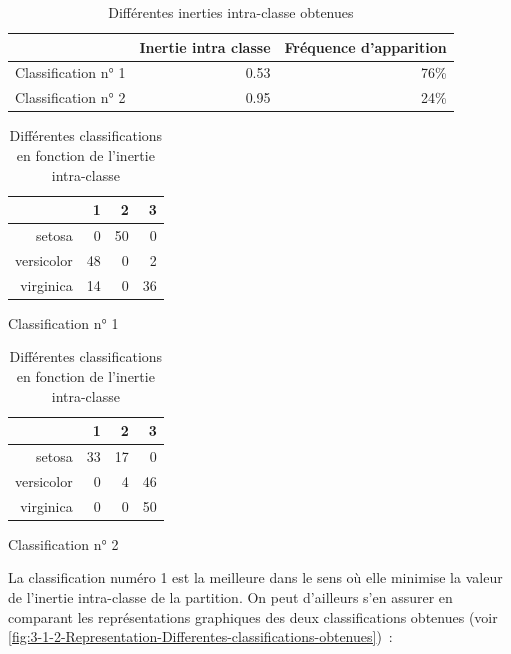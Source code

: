 \documentclass[a4paper,10pt]{report}
\begin{document}
\begin{table}[H]
	\centering
	\captionsetup{justification=centering, margin=3cm}
	\begin{tabular}{r|r|r}
		& Inertie intra classe & Fréquence d'apparition \\ 
		\hline
		Classification n° 1 & 0.53 &  76\% \\ 
		Classification n° 2 & 0.95 &  24\% \\ 
	\end{tabular}
	\caption{\small Différentes inerties intra-classe obtenues}
	\label{table:3-1-2-Différentes-inerties-intra-classe-obtenues}
\end{table}


\begin{table}[H]
	\centering
	\captionsetup{justification=centering, margin=3cm}
	\begin{subtable}{.3\textwidth}
		\centering
		\begin{tabular}{r|rrr}
			& 1 & 2 & 3 \\ 
			\hline
			setosa &   0 &  50 &   0 \\ 
			versicolor &  48 &   0 &   2 \\ 
			virginica &  14 &   0 &  36 \\ 
		\end{tabular}
		\caption{\small Classification n° 1}
	\end{subtable}
	\begin{subtable}{.3\textwidth}
		\centering
		\begin{tabular}{r|rrr}
			& 1 & 2 & 3 \\ 
			\hline
			setosa &  33 &  17 &   0 \\ 
			versicolor &   0 &   4 &  46 \\ 
			virginica &   0 &   0 &  50 \\ 
		\end{tabular}
		\caption{\small Classification n° 2}
	\end{subtable}
	\caption{\small Différentes classifications en fonction de l'inertie intra-classe}
	\label{table:3-1-2-Différentes-classifications-obtenues}
\end{table}


La classification numéro 1 est la meilleure dans le sens où elle minimise la valeur de l'inertie intra-classe de la partition. On peut d'ailleurs s'en assurer en comparant les représentations graphiques des deux classifications obtenues (voir \autoref{fig:3-1-2-Representation-Differentes-classifications-obtenues})~:
\end{document}
